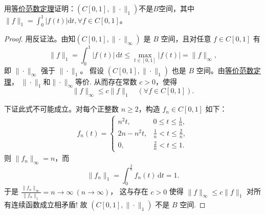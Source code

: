 \documentclass[../../main.tex]{subfiles}%
\begin{document}
\begin{example}
用\hyperref[corollary:泛函分析--等价范数定理]{等价范数定理}证明：$(C[0,1],\|\cdot\|_1)$不是$B$空间，其中$\|f\|_1=\int_{0}^{1}|f(t)|\mathrm{d}t,\forall f\in C[0,1]$。
\end{example}
\begin{proof}

用反证法。由知$(C[0,1],\|\cdot\|_\infty)$ 是 $B$ 空间，且对任意 $f\in C[0,1]$ 有
\[
\|f\|_1 = \int_0^1 |f(t)|\,\mathrm{d}t \leqslant \max_{t\in[0,1]}|f(t)| = \|f\|_\infty,
\]
即 $\|\cdot\|_\infty$ 强于 $\|\cdot\|_1$。
假设 $(C[0,1],\|\cdot\|_1)$ 也是 $B$ 空间。由\hyperref[corollary:泛函分析--等价范数定理]{等价范数定理}，
$\|\cdot\|_1$和$\|\cdot\|_{\infty}$等价.
从而存在常数 $c>0$，使得
\[
\|f\|_\infty \leqslant c\|f\|_1 \quad (\forall f\in C[0,1]).
\]

下证此式不可能成立。对每个正整数 $n\geqslant 2$，构造 $f_n\in C[0,1]$ 如下：
\begin{align*}
f_n(t) =
\begin{cases}
n^2t, & 0 \leqslant t \leqslant \frac{1}{n}, \\[2pt]
2n - n^2t, & \frac{1}{n} < t \leqslant \frac{2}{n}, \\[2pt]
0, & \frac{2}{n} < t \leqslant 1.
\end{cases}
\end{align*}
则 $\|f_n\|_\infty = n$，而
\[
\|f_n\|_1 = \int_0^{\frac{2}{n}} f_n(t)\,\mathrm{d}t = 1.
\]
于是 $\frac{\|f_n\|_\infty}{\|f_n\|_1} = n \to \infty\ (n\to\infty)$，
这与存在 $c>0$ 使得 $\|f\|_\infty \leqslant c\|f\|_1$ 对所有连续函数成立相矛盾!
故 $(C[0,1],\|\cdot\|_1)$ 不是 $B$ 空间.
\end{proof}
\end{document}
